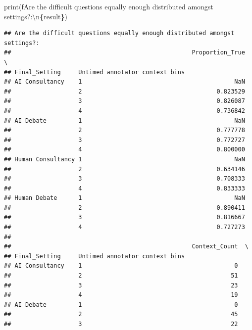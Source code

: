 \documentclass[
]{article}
\newenvironment{Shaded}{\begin{snugshade}}{\end{snugshade}}
\newcommand{\BuiltInTok}[1]{#1}
\newcommand{\CharTok}[1]{\textcolor[rgb]{0.31,0.60,0.02}{#1}}
\newcommand{\NormalTok}[1]{#1}
\newcommand{\SpecialCharTok}[1]{\textcolor[rgb]{0.81,0.36,0.00}{\textbf{#1}}}
\newcommand{\SpecialStringTok}[1]{\textcolor[rgb]{0.31,0.60,0.02}{#1}}
\begin{document}
\begin{Shaded}
\begin{Highlighting}[]
\BuiltInTok{print}\NormalTok{(}\SpecialStringTok{f\textquotesingle{}Are the difficult questions equally enough distributed amongst settings?:}\CharTok{\textbackslash{}n}\SpecialCharTok{\{}\NormalTok{result}\SpecialCharTok{\}}\SpecialStringTok{\textquotesingle{}}\NormalTok{)}
\end{Highlighting}
\end{Shaded}

\begin{verbatim}
## Are the difficult questions equally enough distributed amongst settings?:
##                                                   Proportion_True  \
## Final_Setting     Untimed annotator context bins                    
## AI Consultancy    1                                           NaN   
##                   2                                      0.823529   
##                   3                                      0.826087   
##                   4                                      0.736842   
## AI Debate         1                                           NaN   
##                   2                                      0.777778   
##                   3                                      0.772727   
##                   4                                      0.800000   
## Human Consultancy 1                                           NaN   
##                   2                                      0.634146   
##                   3                                      0.708333   
##                   4                                      0.833333   
## Human Debate      1                                           NaN   
##                   2                                      0.890411   
##                   3                                      0.816667   
##                   4                                      0.727273   
## 
##                                                   Context_Count  \
## Final_Setting     Untimed annotator context bins                  
## AI Consultancy    1                                           0   
##                   2                                          51   
##                   3                                          23   
##                   4                                          19   
## AI Debate         1                                           0   
##                   2                                          45   
##                   3                                          22   

\end{verbatim}
\end{document}
